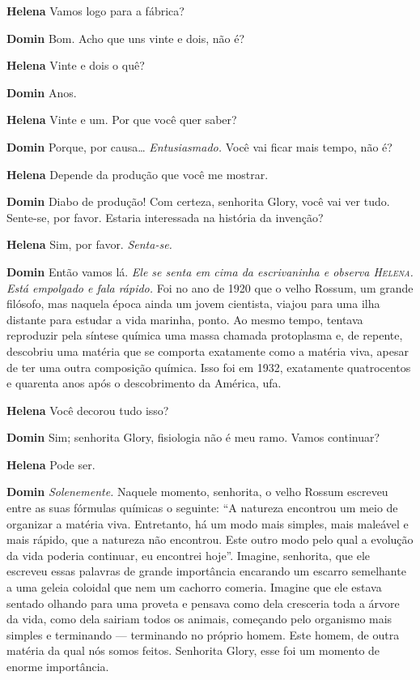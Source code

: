 \textbf{Helena} Vamos logo para a fábrica?

\textbf{Domin} Bom. Acho que uns vinte e dois, não é?

\textbf{Helena} Vinte e dois o quê?

\textbf{Domin} Anos.

\textbf{Helena} Vinte e um. Por que você quer saber?

\textbf{Domin} Porque, por causa\ldots{} \emph{Entusiasmado.} Você vai ficar mais tempo,
não é?

\textbf{Helena} Depende da produção que você me mostrar.

\textbf{Domin} Diabo de produção! Com certeza, senhorita Glory, você vai ver tudo.
Sente-se, por favor. Estaria interessada na história da invenção?

\textbf{Helena} Sim, por favor. \emph{Senta-se.}

\textbf{Domin} Então vamos lá. \emph{Ele se senta em cima da escrivaninha e observa
\textsc{Helena}. Está empolgado e fala rápido.} Foi no ano de 1920 que o velho Rossum,
um grande filósofo, mas naquela época ainda um jovem cientista, viajou para uma
ilha distante para estudar a vida marinha, ponto. Ao mesmo tempo, tentava
reproduzir pela síntese química uma massa chamada protoplasma e, de repente,
descobriu uma matéria que se comporta exatamente como a matéria viva, apesar de
ter uma outra composição química. Isso foi em 1932, exatamente
quatrocentos e quarenta anos após o descobrimento da América, ufa.

\textbf{Helena} Você decorou tudo isso?

\textbf{Domin} Sim; senhorita Glory, fisiologia não é meu ramo. Vamos continuar?

\textbf{Helena} Pode ser.

\textbf{Domin} \emph{Solenemente.} Naquele momento, senhorita, o velho Rossum escreveu
entre as suas fórmulas químicas o seguinte: ``A natureza encontrou um meio de
organizar a matéria viva. Entretanto, há um modo mais simples, mais maleável e
mais rápido, que a natureza não encontrou. Este outro modo pelo qual a evolução da vida poderia
continuar, eu encontrei hoje''. Imagine, senhorita, que ele
escreveu essas palavras de grande importância encarando um escarro semelhante a
uma geleia coloidal que nem um cachorro comeria. Imagine que ele estava sentado
olhando para uma proveta e pensava como dela cresceria toda a árvore da vida,
como dela sairiam todos os animais, começando pelo organismo mais simples e
terminando --- terminando no próprio homem. Este homem, de outra matéria da qual
nós somos feitos. Senhorita Glory, esse foi um momento de enorme importância.

